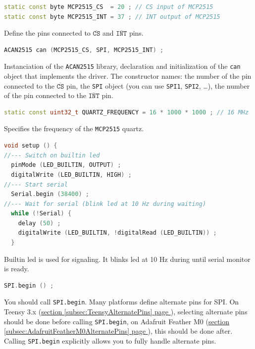 \documentclass[10pt, a4paper, obeyspaces]{extarticle}
\newcommand\refSubsectionPage[1]{\hyperref[subsec:#1]{section \ref*{subsec:#1} page \pageref{subsec:#1}}}
\begin{document}
{ \small\begin{lstlisting}[language=c++]
static const byte MCP2515_CS  = 20 ; // CS input of MCP2515 
static const byte MCP2515_INT = 37 ; // INT output of MCP2515
\end{lstlisting}}
Define the pins connected to $\overline{\texttt{CS}}$ and $\overline{\texttt{INT}}$ pins.




{ \small\begin{lstlisting}[language=c++]
ACAN2515 can (MCP2515_CS, SPI, MCP2515_INT) ;
\end{lstlisting}}
Instanciation of the \texttt{ACAN2515} library, declaration and initialization of the \texttt{can} object that implements the driver. The constructor names: the number of the pin connected to the $\overline{\texttt{CS}}$ pin, the \texttt{SPI} object (you can use \texttt{SPI1}, \texttt{SPI2}, …), the number of the pin connected to the $\overline{\texttt{INT}}$ pin.



{ \small\begin{lstlisting}[language=c++]
static const uint32_t QUARTZ_FREQUENCY = 16 * 1000 * 1000 ; // 16 MHz
\end{lstlisting}}

Specifies the frequency of the \texttt{MCP2515} quartz.








{ \small\begin{lstlisting}[language=c++]
void setup () {
//--- Switch on builtin led
  pinMode (LED_BUILTIN, OUTPUT) ;
  digitalWrite (LED_BUILTIN, HIGH) ;
//--- Start serial
  Serial.begin (38400) ;
//--- Wait for serial (blink led at 10 Hz during waiting)
  while (!Serial) {
    delay (50) ;
    digitalWrite (LED_BUILTIN, !digitalRead (LED_BUILTIN)) ;
  }
\end{lstlisting}}
Builtin led is used for signaling. It blinks led at 10 Hz during until serial monitor is ready.



{ \small\begin{lstlisting}[language=c++]
  SPI.begin () ;
\end{lstlisting}}
You should call \texttt{SPI.begin}. Many platforms define alternate pins for SPI. On Teensy 3.x (\refSubsectionPage{TeensyAlternatePins}), selecting alternate pins should be done before calling \texttt{SPI.begin}, on Adafruit Feather M0 (\refSubsectionPage{AdafruitFeatherM0AlternatePins}), this should be done after. Calling \texttt{SPI.begin} explicitly allows you to fully handle alternate pins.
\end{document}
